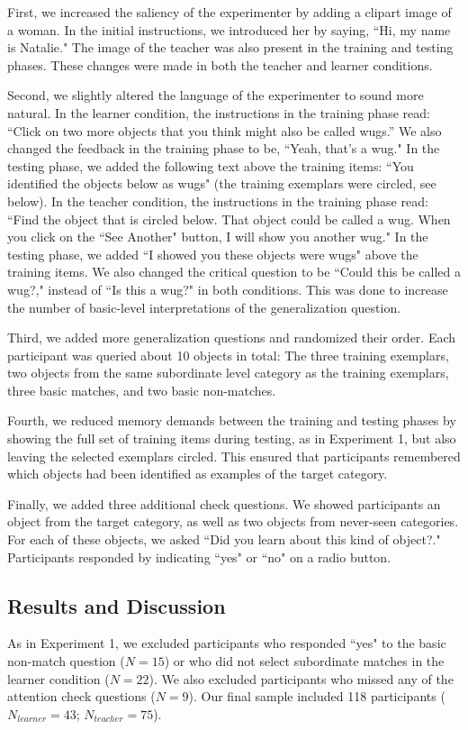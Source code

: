 \documentclass[man]{apa2}
\begin{document}
First, we increased the saliency of the experimenter by adding a clipart image of a woman. In the initial instructions, we introduced her by saying, ``Hi, my name is Natalie." The image of the teacher was also present in the training and testing phases. These changes were made in both the teacher and learner conditions.

Second, we slightly altered the language of the experimenter to sound more natural. In the learner condition, the instructions in the training phase read: ``Click on two more objects that you think might also be called wugs.'' We also changed the feedback in the training phase to be, ``Yeah, that's a wug." In the testing phase, we added the following text above the training items: ``You identified the objects below as wugs" (the training exemplars were circled, see below). In the teacher condition, the instructions in the training phase read: ``Find the object that is circled below. That object could be called a wug. When you click on the ``See Another" button, I will show you another wug." In the testing phase, we added ``I showed you these objects were wugs" above the training items.  We also changed the critical question to be ``Could this be called a wug?," instead of ``Is this a wug?" in both conditions. This was done to increase the number of basic-level interpretations of the generalization question. 

Third, we added more generalization questions and randomized their order. Each participant was queried about 10 objects in total: The three training exemplars, two objects from the same subordinate level category as the training exemplars, three basic matches, and two basic non-matches. 

Fourth, we reduced memory demands between the training and testing phases by showing the full set of training items during testing, as in Experiment 1, but also leaving the selected exemplars circled. This ensured that participants remembered which objects had been identified as examples of the target category. 

Finally, we added three additional check questions.  We showed participants an object from the target category, as well as two objects from never-seen categories. For each of these objects, we asked ``Did you learn about this kind of object?." Participants responded by indicating ``yes" or ``no" on a radio button.

\subsection{Results and Discussion}
As in Experiment 1, we excluded participants who responded ``yes" to the basic non-match question ($N=15$) or who did not select subordinate matches in the learner condition ($N = 22$). We also excluded participants who missed any of the attention check questions ($N = 9$). Our final sample  included 118 participants ($N_{learner} = 43$; $N_{teacher} = 75$).
\end{document}
